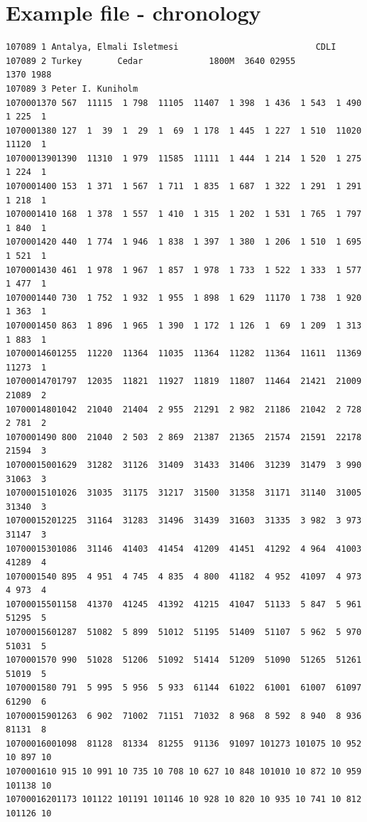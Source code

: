 \section{Example file - chronology}
\begin{lstlisting}
107089 1 Antalya, Elmali Isletmesi                           CDLI               
107089 2 Turkey       Cedar             1800M  3640 02955          1370 1988    
107089 3 Peter I. Kuniholm                                                      
1070001370 567  11115  1 798  11105  11407  1 398  1 436  1 543  1 490  1 225  1
1070001380 127  1  39  1  29  1  69  1 178  1 445  1 227  1 510  11020  11120  1
10700013901390  11310  1 979  11585  11111  1 444  1 214  1 520  1 275  1 224  1
1070001400 153  1 371  1 567  1 711  1 835  1 687  1 322  1 291  1 291  1 218  1
1070001410 168  1 378  1 557  1 410  1 315  1 202  1 531  1 765  1 797  1 840  1
1070001420 440  1 774  1 946  1 838  1 397  1 380  1 206  1 510  1 695  1 521  1
1070001430 461  1 978  1 967  1 857  1 978  1 733  1 522  1 333  1 577  1 477  1
1070001440 730  1 752  1 932  1 955  1 898  1 629  11170  1 738  1 920  1 363  1
1070001450 863  1 896  1 965  1 390  1 172  1 126  1  69  1 209  1 313  1 883  1
10700014601255  11220  11364  11035  11364  11282  11364  11611  11369  11273  1
10700014701797  12035  11821  11927  11819  11807  11464  21421  21009  21089  2
10700014801042  21040  21404  2 955  21291  2 982  21186  21042  2 728  2 781  2
1070001490 800  21040  2 503  2 869  21387  21365  21574  21591  22178  21594  3
10700015001629  31282  31126  31409  31433  31406  31239  31479  3 990  31063  3
10700015101026  31035  31175  31217  31500  31358  31171  31140  31005  31340  3
10700015201225  31164  31283  31496  31439  31603  31335  3 982  3 973  31147  3
10700015301086  31146  41403  41454  41209  41451  41292  4 964  41003  41289  4
1070001540 895  4 951  4 745  4 835  4 800  41182  4 952  41097  4 973  4 973  4
10700015501158  41370  41245  41392  41215  41047  51133  5 847  5 961  51295  5
10700015601287  51082  5 899  51012  51195  51409  51107  5 962  5 970  51031  5
1070001570 990  51028  51206  51092  51414  51209  51090  51265  51261  51019  5
1070001580 791  5 995  5 956  5 933  61144  61022  61001  61007  61097  61290  6
10700015901263  6 902  71002  71151  71032  8 968  8 592  8 940  8 936  81131  8
10700016001098  81128  81334  81255  91136  91097 101273 101075 10 952 10 897 10
1070001610 915 10 991 10 735 10 708 10 627 10 848 101010 10 872 10 959 101138 10
10700016201173 101122 101191 101146 10 928 10 820 10 935 10 741 10 812 101126 10

\end{lstlisting}
